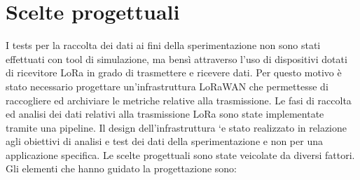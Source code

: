 \documentclass[12pt,a4paper,openright,twoside]{report}
\begin{document}
\section{Scelte progettuali}
I tests per la raccolta dei dati ai fini della sperimentazione non sono stati effettuati con tool di simulazione, ma bens\`i attraverso l'uso di dispositivi dotati di ricevitore LoRa in grado di trasmettere e ricevere dati. 
Per questo motivo \`e stato necessario progettare un'infrastruttura LoRaWAN che permettesse di raccogliere ed archiviare le metriche relative alla trasmissione.
Le fasi di raccolta ed analisi dei dati relativi alla trasmissione LoRa sono state implementate tramite una pipeline. 
Il design dell'infrastruttura `e stato realizzato in relazione agli obiettivi di analisi e test dei dati della sperimentazione e non per una applicazione specifica. 
Le scelte progettuali sono state veicolate da diversi fattori. Gli elementi che hanno guidato la progettazione sono:
\end{document}
